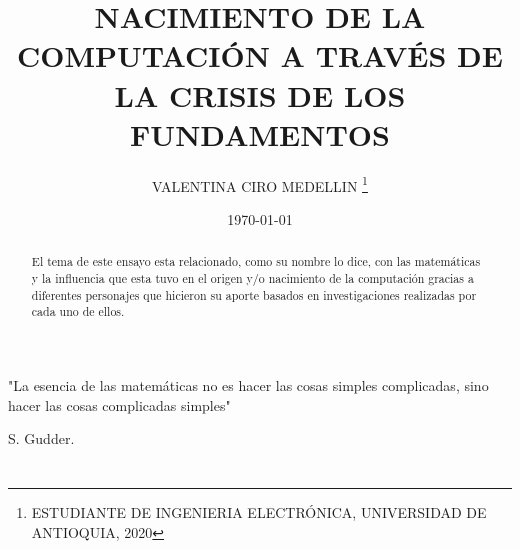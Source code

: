 \documentclass[11pt,letterpaper]{article}
\author{VALENTINA CIRO MEDELLIN \thanks{ESTUDIANTE DE INGENIERIA ELECTRÓNICA, UNIVERSIDAD DE ANTIOQUIA, 2020}}
\title{NACIMIENTO DE LA COMPUTACIÓN A TRAVÉS DE LA CRISIS DE LOS FUNDAMENTOS}
\date{\today}
\begin{document}
\maketitle





\begin{abstract}
El tema de este ensayo esta relacionado, como su nombre lo dice, con las matemáticas y la influencia que esta tuvo en el origen y/o nacimiento de la computación gracias a diferentes personajes que hicieron su aporte basados en investigaciones realizadas por cada uno de ellos. 
\end{abstract}



\epigraph{"La esencia de las matemáticas no es hacer las cosas simples complicadas, sino hacer las cosas complicadas simples" }{S. Gudder.}


\section*{} %
\end{document}
